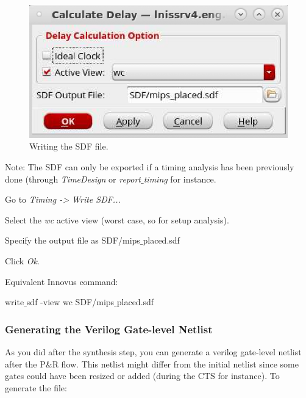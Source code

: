 \begin{enumerate}
	\parbox[t]{\dimexpr\textwidth-\leftmargin}{%
		\begin{figure}
			\vspace{-6mm}
			\centering
			\vspace{-\baselineskip}
	\includegraphics[scale=0.45]{figures/lab5_backend/write_sdf}
\caption{Writing the SDF file.}
			\label{write_sdf}
		\end{figure}
		\item Note: The SDF can only be exported if a timing analysis has been previously done (through \textit{TimeDesign} or \textit{report$\_$timing} for instance.
		\item Go to \textit{Timing  -> Write SDF...}
		\item Select the \textit{wc} active view (worst case, so for setup analysis).
		\item Specify the output file as SDF/mips$\_$placed.sdf
		\item Click \textit{Ok}.
	} 
	\vspace{6mm}
\end{enumerate}



Equivalent Innovus command:
\begin{codeline}
write$\_$sdf -view wc SDF/mips$\_$placed.sdf
\end{codeline}

\subsubsection{Generating the Verilog Gate-level Netlist}
As you did after the synthesis step, you can generate a verilog gate-level netlist after the P$\&$R flow. This netlist might differ from the initial netlist since some gates could have been resized or added (during the CTS for instance). To generate the file:

